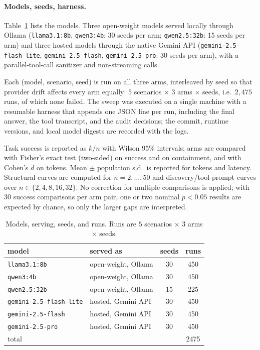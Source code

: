 \documentclass[conference,letterpaper]{IEEEtran}
\begin{document}
\paragraph{Models, seeds, harness.} Table~\ref{tab:models} lists the models. Three open-weight models served locally through Ollama
(\texttt{llama3.1:8b}, \texttt{qwen3:4b}: 30 seeds per arm; \texttt{qwen2.5:32b}: 15 seeds per arm)
and three hosted models through the native Gemini API (\texttt{gemini-2.5-flash-lite},
\texttt{gemini-2.5-flash}, \texttt{gemini-2.5-pro}: 30 seeds per arm), with a parallel-tool-call
sanitizer and non-streaming calls.

Each (model, scenario, seed) is run on all three arms, interleaved
by seed so that provider drift affects every arm equally: $5$ scenarios $\times$ $3$ arms $\times$
seeds, i.e.\ $2{,}475$ runs, of which none failed. The sweep was executed on a single machine with a
resumable harness that appends one JSON line per run, including the final answer, the tool transcript,
and the audit decisions; the commit, runtime versions, and local model digests are recorded with the
logs.

Task success is reported as $k/n$ with Wilson 95\% intervals; arms are compared with Fisher's
exact test (two-sided) on success and on containment, and with Cohen's $d$ on tokens. Mean $\pm$
population s.d.\ is reported for tokens and latency. Structural curves are computed for
$n=2,\dots,50$ and discovery/tool-prompt curves over $n\in\{2,4,8,16,32\}$. No correction for
multiple comparisons is applied; with $30$ success comparisons per arm pair, one or two nominal
$p<0.05$ results are expected by chance, so only the larger gaps are interpreted.

\begin{table}[H]
\centering
\caption{Models, serving, seeds, and runs. Runs are $5$ scenarios $\times$ $3$ arms $\times$ seeds.}
\label{tab:models}
\footnotesize
\setlength{\tabcolsep}{3pt}
\begin{tabular}{llcc}
\toprule
model & served as & seeds & runs \\
\midrule
\texttt{llama3.1:8b} & open-weight, Ollama & 30 & 450 \\
\texttt{qwen3:4b} & open-weight, Ollama & 30 & 450 \\
\texttt{qwen2.5:32b} & open-weight, Ollama & 15 & 225 \\
\texttt{gemini-2.5-flash-lite} & hosted, Gemini API & 30 & 450 \\
\texttt{gemini-2.5-flash} & hosted, Gemini API & 30 & 450 \\
\texttt{gemini-2.5-pro} & hosted, Gemini API & 30 & 450 \\
\midrule
total & & & 2475 \\
\bottomrule
\end{tabular}
\end{table}
\end{document}
